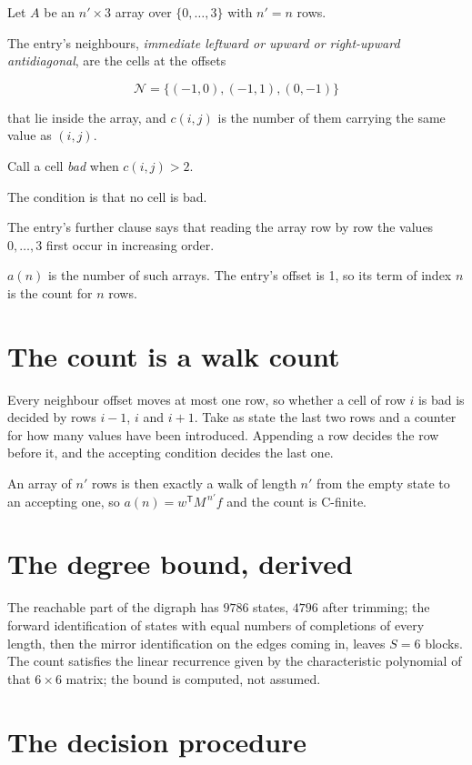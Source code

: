 \documentclass[11pt]{article}
\theoremstyle{definition}
\begin{document}
Let $A$ be an $n' \times 3$ array over $\{0,\dots,3\}$ with $n' = n$ rows.

The entry's neighbours, {\itshape immediate leftward or upward or right-upward antidiagonal}, are the cells at the offsets

\[\mathcal{N} = \{(-1,0), (-1,1), (0,-1)\}\]

that lie inside the array, and $c(i,j)$ is the number of them carrying the same value as $(i,j)$.

Call a cell {\itshape bad} when $c(i,j) > 2$.

The condition is that no cell is bad.

The entry's further clause says that reading the array row by row the values $0,\dots,3$ first occur in increasing order.

$a(n)$ is the number of such arrays. The entry's offset is 1, so its term of index $n$ is the count for $n$ rows.

\section{The count is a walk count}

Every neighbour offset moves at most one row, so whether a cell of row $i$ is bad is decided by rows $i-1$, $i$ and $i+1$. Take as state the last two rows and a counter for how many values have been introduced. Appending a row decides the row before it, and the accepting condition decides the last one.

An array of $n'$ rows is then exactly a walk of length $n'$ from the empty state to an accepting one, so $a(n) = w^{\mathsf T}M^{\,n'}f$ and the count is C-finite.

\section{The degree bound, derived}

The reachable part of the digraph has $9786$ states, $4796$ after trimming; the forward identification of states with equal numbers of completions of every length, then the mirror identification on the edges coming in, leaves $S = 6$ blocks. The count satisfies the linear recurrence given by the characteristic polynomial of that $6\times6$ matrix; the bound is computed, not assumed.

\section{The decision procedure}
\end{document}
